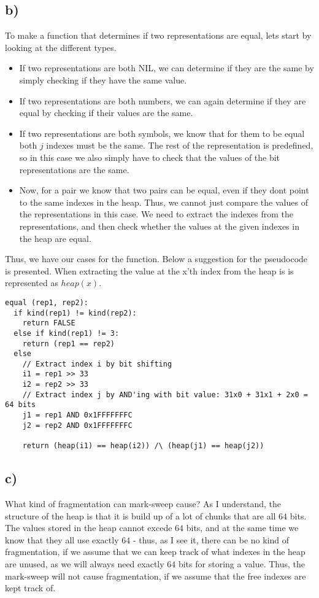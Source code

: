 \subsection*{b)}
To make a function that determines if two representations are equal, lets start by looking at the different types. 
\begin{itemize}
	\item If two representations are both NIL, we can determine if they are the same by simply checking if they have the same value.
	\item If two representations are both numbers, we can again determine if they are equal by checking if their values are the same.
	\item If two representations are both symbols, we know that for them to be equal both $j$ indexes must be the same. The rest of the representation is predefined, so in this case we also simply have to check that the values of the bit representations are the same.
	\item Now, for a pair we know that two pairs can be equal, even if they dont point to the same indexes in the heap. Thus, we cannot just compare the values of the representations in this case. We need to extract the indexes from the representations, and then check whether the values at the given indexes in the heap are equal.
\end{itemize}
Thus, we have our cases for the function. Below a suggestion for the pseudocode is presented. When extracting the value at the x'th index from the heap is is represented as $heap(x)$.
\begin{verbatim}
equal (rep1, rep2):
  if kind(rep1) != kind(rep2):
    return FALSE
  else if kind(rep1) != 3:
    return (rep1 == rep2)
  else
    // Extract index i by bit shifting
    i1 = rep1 >> 33
    i2 = rep2 >> 33
    // Extract index j by AND'ing with bit value: 31x0 + 31x1 + 2x0 = 64 bits
    j1 = rep1 AND 0x1FFFFFFFC
    j2 = rep2 AND 0x1FFFFFFFC
    
    return (heap(i1) == heap(i2)) /\ (heap(j1) == heap(j2))
\end{verbatim}



\subsection*{c)}
What kind of fragmentation can mark-sweep cause? As I understand, the structure of the heap is that it is build up of a lot of chunks that are all $64$ bits. The values stored in the heap cannot excede $64$ bits, and at the same time we know that they all use exactly $64$ - thus, as I see it, there can be no kind of fragmentation, if we assume that we can keep track of what indexes in the heap are unused, as we will always need exactly $64$ bits for storing a value. Thus, the mark-sweep will not cause fragmentation, if we assume that the free indexes are kept track of.

